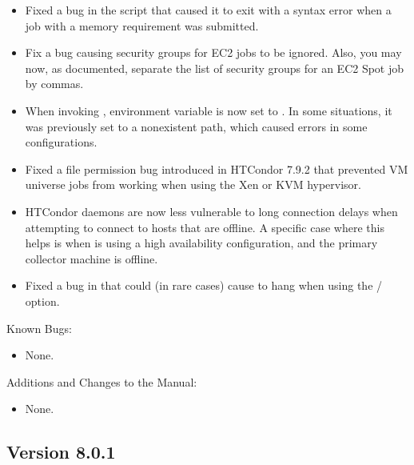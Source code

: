\begin{itemize}
\item Fixed a bug in the  script that caused it to exit
with a syntax error when a job with a memory requirement was
submitted.

\item Fix a bug causing security groups for EC2 jobs to be ignored.  Also,
you may now, as documented, separate the list of security groups for
an EC2 Spot job by commas.

\item When invoking , environment variable
 is now set to .  
In some situations, it was previously set
to a nonexistent path, which caused errors in some configurations.

\item Fixed a file permission bug introduced in HTCondor 7.9.2 that
prevented VM universe jobs from working when using the Xen or KVM
hypervisor.

\item HTCondor daemons are now less vulnerable to long connection delays
when attempting to connect to hosts that are offline.  A specific case
where this helps is when  is using a high availability
configuration, and the primary collector machine is offline.

\item Fixed a bug in  that could (in rare cases) cause
 to hang when using the
/ option.

\end{itemize}

\noindent Known Bugs:

\begin{itemize}

\item None.

\end{itemize}

\noindent Additions and Changes to the Manual:

\begin{itemize}

\item None.

\end{itemize}


\subsection*{\label{sec:New-8-0-1}Version 8.0.1}

